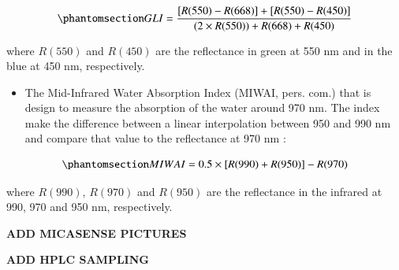 \documentclass[
  number]{elsarticle}
\providecommand{\tightlist}{%
  \setlength{\itemsep}{0pt}\setlength{\parskip}{0pt}}\usepackage{longtable,booktabs,array}
\begin{document}
\begin{equation}\phantomsection\label{eq-gli}{
GLI = \frac{[R(550)-R(668)]+[R(550)-R(450)]}{(2 \times R(550) )+ R(668) + R(450) }
}\end{equation}

where \(R(550)\) and \(R(450)\) are the reflectance in green at 550 nm
and in the blue at 450 nm, respectively.

\begin{itemize}
\tightlist
\item
  The Mid-Infrared Water Absorption Index (MIWAI, pers. com.) that is
  design to measure the absorption of the water around 970 nm. The index
  make the difference between a linear interpolation between 950 and 990
  nm and compare that value to the reflectance at 970 nm :
\end{itemize}

\begin{equation}\phantomsection\label{eq-MIWAI}{
MIWAI = 0.5 \times [R(990)+R(950)]-R(970)
}\end{equation}

where \(R(990)\), \(R(970)\) and \(R(950)\) are the reflectance in the
infrared at 990, 970 and 950 nm, respectively.

\textbf{ADD MICASENSE PICTURES}

\textbf{ADD HPLC SAMPLING}


\renewcommand\refname{Bibliography}
  
\end{document}

